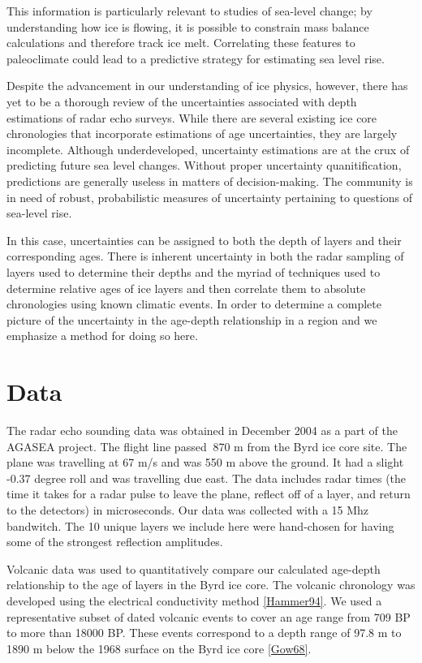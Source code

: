 \documentclass[draft,jgrga]{agutex}
\begin{document}
This information is particularly relevant to studies of sea-level
change; by understanding how ice is flowing, it is possible to
constrain mass balance calculations and therefore track ice
melt. Correlating these features to paleoclimate could lead to a
predictive strategy for estimating sea level rise.

Despite the advancement in our understanding of ice physics, however,
there has yet to be a thorough review of the uncertainties associated
with depth estimations of radar echo surveys. While there are several
existing ice core chronologies that incorporate estimations of age
uncertainties, they are largely incomplete. Although underdeveloped,
uncertainty estimations are at the crux of predicting future sea level 
changes. Without proper uncertainty quanitification, predictions are 
generally useless in matters of decision-making. The community is in
need of robust, probabilistic measures of uncertainty pertaining to
questions of sea-level rise.
 
In this case, uncertainties can be assigned to both the depth of
layers and their corresponding ages. There is inherent uncertainty in
both the radar sampling of layers used to determine their depths and
the myriad of techniques used to determine relative ages of ice layers
and then correlate them to absolute chronologies using known climatic
events. In order to determine a complete picture of the uncertainty
in the age-depth relationship in a region and we emphasize a method
for doing so here.


\section{Data}

The radar echo sounding data was obtained in December 2004 as a part
of the AGASEA project. The flight line passed $~$870 m from the Byrd
ice core site. The plane was travelling at 67 m/s and was 550 m above the
ground. It had a slight -0.37 degree roll and was travelling due
east. The data includes radar times (the time it takes for a radar
pulse to leave the plane, reflect off of a layer, and return to the
detectors) in microseconds. Our data was collected with a 15 Mhz
bandwitch. The 10 unique layers we include here were
hand-chosen for having some of the strongest reflection amplitudes.

Volcanic data was used to quantitatively compare our calculated
age-depth relationship to the age of layers in the Byrd ice core. The
volcanic chronology was developed using the electrical conductivity
method \ref{Hammer94}. We used a representative subset of dated
volcanic events to cover an age range from 709 BP to more than 18000 BP. 
These events correspond to a depth range of 97.8 m to 1890 m below the
1968 surface on the Byrd ice core \ref{Gow68}.
\end{document}
